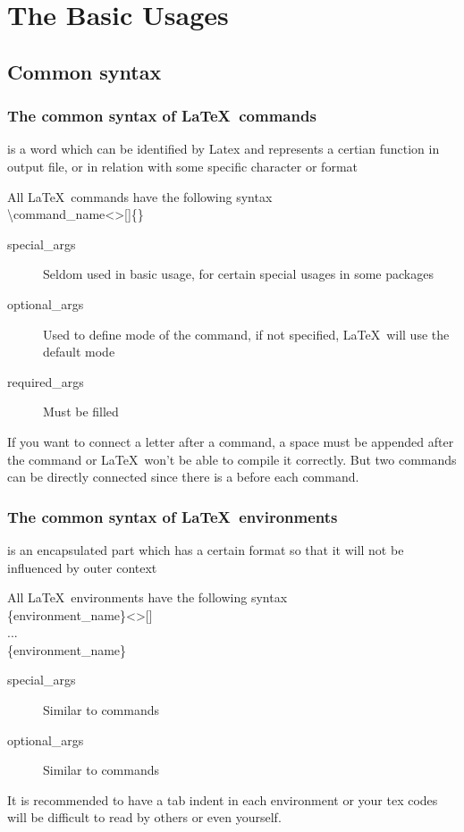 \documentclass{beamer}
\newcommand{\samplebegin}[1]{\structure{\textbackslash begin}\{#1\}}
\newcommand{\sampleend}[1]{\structure{\textbackslash end}\{#1\}}
\newcommand{\samplecommand}[1]{\alert{\textbackslash #1}}
\begin{document}
\section{The Basic Usages}
\begin{frame}
\end{frame}

\subsection{Common syntax}

\begin{frame}
	\frametitle{The common syntax of \LaTeX\ commands}
	\begin{definition}
		 is a word which can be identified by Latex and represents a certian function in output file, or in relation with some specific character or format
	\end{definition}
	All \LaTeX\ commands have the following syntax\\
	\samplecommand{command\_name}\textless {}\textgreater []\{\}
	\begin{description}
		\item[special\_args]	Seldom used in basic usage, for certain special usages in some packages
		\item[optional\_args]	Used to define mode of the command, if not specified, \LaTeX\ will use the default mode
		\item[required\_args]	Must be filled
	\end{description}
	If you want to connect a letter after a command, a space must be appended after the command or \LaTeX\ won't be able to compile it correctly. But two commands can be directly connected since there is a \structure{\textbackslash} before each command.
\end{frame}

\begin{frame}
	\frametitle{The common syntax of \LaTeX\ environments}
	\begin{definition}
		 is an encapsulated part which has a certain format so that it will not be influenced by outer context
	\end{definition}
	All \LaTeX\ environments have the following syntax\\
	\samplebegin{\alert{environment\_name}}\textless {}\textgreater []\\
	\qquad...\\
	\sampleend{\alert{environment\_name}}\\
	\begin{description}
		\item[special\_args]	Similar to commands
		\item[optional\_args]	Similar to commands
	\end{description}
	It is recommended to have a tab indent in each environment or your tex codes will be difficult to read by others or even \alert{yourself}.
\end{frame}
\end{document}
